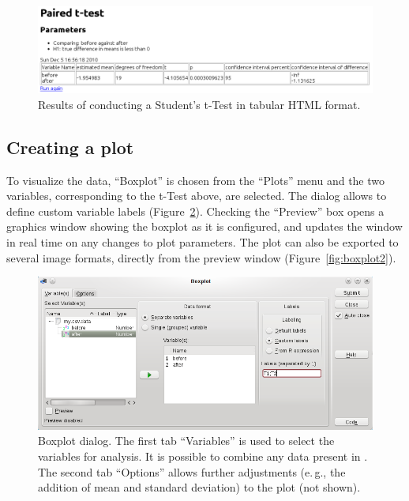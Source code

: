 \begin{figure}[t!]
 \centering
 \includegraphics[width=15.4cm]{./figures/t-test_results.png}
 \caption{Results of conducting a Student's t-Test in tabular HTML format.}
 \label{fig:t_test_results}
\end{figure}

\subsection{Creating a plot}
\label{sec:create_plot}
To visualize the data, ``Boxplot'' is chosen from the ``Plots'' menu
and the two variables, corresponding to the t-Test above, are selected.
The dialog allows to define custom variable labels (Figure~\ref{fig:boxplot1}).
Checking the ``Preview'' box opens a graphics window showing the boxplot as
it is configured, and updates the window in real time on any changes to plot parameters.
The plot can also be exported to several image formats, directly from the preview window (Figure~\ref{fig:boxplot2}).

\begin{figure}[b!]
 \centering
 \includegraphics[width=15.4cm]{./figures/boxplot1.png}
 \caption{Boxplot dialog. The first tab ``Variables'' is used to select the variables for analysis. It is possible to
  combine any data present in . The second tab ``Options'' allows further adjustments (e.\,g., the addition of mean and standard deviation) to the plot (not shown).}
 \label{fig:boxplot1}
\end{figure}

